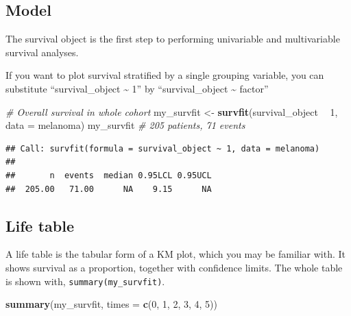 \documentclass[
  12pt,
  krantz2]{krantz}
\makeatletter
\newenvironment{Shaded}{\begin{snugshade}}{\end{snugshade}}
\newcommand{\CommentTok}[1]{\textcolor[rgb]{0.56,0.35,0.01}{\textit{#1}}}
\newcommand{\DataTypeTok}[1]{\textcolor[rgb]{0.13,0.29,0.53}{#1}}
\newcommand{\DecValTok}[1]{\textcolor[rgb]{0.00,0.00,0.81}{#1}}
\newcommand{\KeywordTok}[1]{\textcolor[rgb]{0.13,0.29,0.53}{\textbf{#1}}}
\newcommand{\NormalTok}[1]{#1}
\newcommand{\OperatorTok}[1]{\textcolor[rgb]{0.81,0.36,0.00}{\textbf{#1}}}
\newcommand{\StringTok}[1]{\textcolor[rgb]{0.31,0.60,0.02}{#1}}
\newenvironment{kframe}{%
\medskip{}
\setlength{\fboxsep}{.8em}
 \def\at@end@of@kframe{}%
 \ifinner\ifhmode%
  \def\at@end@of@kframe{\end{minipage}}%
  \begin{minipage}{\columnwidth}%
 \fi\fi%
 \def\FrameCommand##1{\hskip\@totalleftmargin \hskip-\fboxsep
 \colorbox{shadecolor}{##1}\hskip-\fboxsep
     \hskip-\linewidth \hskip-\@totalleftmargin \hskip\columnwidth}%
 \MakeFramed {\advance\hsize-\width
   \@totalleftmargin\z@ \linewidth\hsize
   \@setminipage}}%
 {\par\unskip\endMakeFramed%
 \at@end@of@kframe}
\renewenvironment{Shaded}{\begin{kframe}}{\end{kframe}}
\makeatother
\begin{document}
\hypertarget{model}{%
\subsection{Model}\label{model}}

The survival object is the first step to performing univariable and multivariable survival analyses.

If you want to plot survival stratified by a single grouping variable, you can substitute ``survival\_object \textasciitilde{} 1'' by ``survival\_object \textasciitilde{} factor''

\begin{Shaded}
\begin{Highlighting}[]
\CommentTok{# Overall survival in whole cohort}
\NormalTok{my_survfit <-}\StringTok{ }\KeywordTok{survfit}\NormalTok{(survival_object }\OperatorTok{~}\StringTok{ }\DecValTok{1}\NormalTok{, }\DataTypeTok{data =}\NormalTok{ melanoma)}
\NormalTok{my_survfit }\CommentTok{# 205 patients, 71 events}
\end{Highlighting}
\end{Shaded}

\begin{verbatim}
## Call: survfit(formula = survival_object ~ 1, data = melanoma)
## 
##       n  events  median 0.95LCL 0.95UCL 
##  205.00   71.00      NA    9.15      NA
\end{verbatim}


\hypertarget{life-table}{%
\subsection{Life table}\label{life-table}}


A life table is the tabular form of a KM plot, which you may be familiar with.
It shows survival as a proportion, together with confidence limits.
The whole table is shown with, \texttt{summary(my\_survfit)}.

\begin{Shaded}
\begin{Highlighting}[]
\KeywordTok{summary}\NormalTok{(my_survfit, }\DataTypeTok{times =} \KeywordTok{c}\NormalTok{(}\DecValTok{0}\NormalTok{, }\DecValTok{1}\NormalTok{, }\DecValTok{2}\NormalTok{, }\DecValTok{3}\NormalTok{, }\DecValTok{4}\NormalTok{, }\DecValTok{5}\NormalTok{))}
\end{Highlighting}
\end{Shaded}
\end{document}
